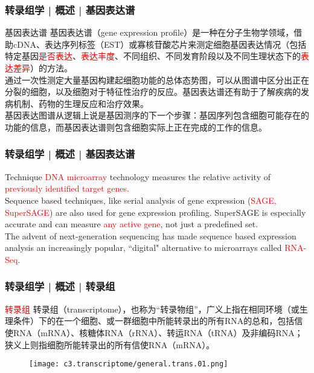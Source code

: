 \begin{frame}
  \frametitle{转录组学 | 概述 | 基因表达谱}
  \begin{block}{基因表达谱}
    基因表达谱（gene expression profile）是一种在分子生物学领域，借助cDNA、表达序列标签（EST）或寡核苷酸芯片来测定细胞基因表达情况（包括特定基因\textcolor{red}{是否表达}、\textcolor{red}{表达丰度}、不同组织、不同发育阶段以及不同生理状态下的\textcolor{red}{表达差异}）的方法。\\
\vspace{1em}
通过一次性测定大量基因构建起细胞功能的总体态势图，可以从图谱中区分出正在分裂的细胞，以及细胞对于特征性治疗的反应。基因表达谱还有助于了解疾病的发病机制、药物的生理反应和治疗效果。\\
\vspace{1em}
基因表达图谱从逻辑上说是基因测序的下一个步骤：基因序列包含细胞可能存在的功能的信息，而基因表达谱则包含细胞实际上正在完成的工作的信息。
  \end{block}
\end{frame}

\begin{frame}
  \frametitle{转录组学 | 概述 | 基因表达谱}
  \begin{block}{Technique}
    \textcolor{red}{DNA microarray} technology measures the relative activity of \textcolor{red}{previously identified target genes}.\\
    \vspace{1em}
    Sequence based techniques, like serial analysis of gene expression (\textcolor{red}{SAGE, SuperSAGE}) are also used for gene expression profiling. SuperSAGE is especially accurate and can measure \textcolor{red}{any active gene}, not just a predefined set.\\
 \vspace{1em}
 The advent of next-generation sequencing has made sequence based expression analysis an increasingly popular, ``digital" alternative to microarrays called \textcolor{red}{RNA-Seq}. 
  \end{block}
\end{frame}

\begin{frame}
  \frametitle{转录组学 | 概述 | 转录组}
  \begin{block}{\textcolor{red}{转录组}}
转录组（transcriptome），也称为“转录物组”，广义上指在相同环境（或生理条件）下的在一个细胞、或一群细胞中所能转录出的所有RNA的总和，包括信使RNA（mRNA）、核糖体RNA（rRNA）、转运RNA（tRNA）及非编码RNA；狭义上则指细胞所能转录出的所有信使RNA（mRNA）。
  \end{block}
  \begin{figure}
    \centering
    \texttt{[image: c3.transcriptome/general.trans.01.png]}
  \end{figure}
\end{frame}

